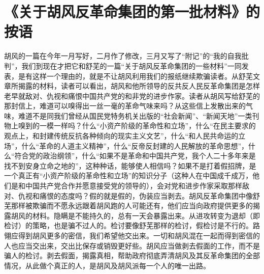 \section[《关于胡风反革命集团的第一批材料》的按语（一九五五年五月十三日）]{《关于胡风反革命集团的第一批材料》的按语}


胡风的一篇在今年一月写好，二月作了修改，三月又写了“附记”的“我的自我批判”，我们到现在才把它和舒芜的一篇“关于胡风反革命集团的一些材料”一同发表，是有这样一个理由的，就是不让胡风利用我们的报纸继续欺骗读者。从舒芜文章所揭露的材料，读者可以看出，胡风和他所领导的反共反人民反革命集团是怎样老早就敌对、仇视和痛恨中国共产党的和非党的进步作家。读者从胡风写给舒芜的那封信上，难道可以嗅得出一丝一毫的革命气味来吗？从这些信上发散出来的气味，难道不是同我们曾经从国民党特务机关出版的“社会新闻”、“新闻天地”一类刊物上嗅到的一模一样吗？什么“小资产阶级的革命性和立场”，什么“在民主要求的观点上，和封建传统反抗各种倾向的现实主义文艺”，什么“和人民共命运的立场”，什么“革命的人道主义精神”，什么“反帝反封建的人民解放的革命思想”，什么“符合党的政治纲领”，什么“如果不是革命和中国共产党，我个人二十多年来是找不到安身立命之地的”，这种种话，能够使人相信吗？如果不是打着假招牌，是一个真正有“小资产阶级的革命性和立场”的知识分子（这种人在中国成千成万，他们是和中国共产党合作并愿意接受党的领导的），会对党和进步作家采取那样敌对、仇视和痛恨的态度吗？假的就是假的，伪装应当剥去。胡风反革命集团中像舒芜那样被欺骗而不愿永远跟着胡风跑的人可能还有，他们应当向政府提供更多的揭露胡风的材料。隐瞒是不能持久的，总有一天会暴露出来。从进攻转变为退却（即检讨）的策略，也是骗不过人的。检讨要像舒芜那样的检讨，假检讨是不行的。路翎应得到胡风更多的密信，我们希望他交出来。一切和胡风混在一起而得到密信的人也应当交出来，交出比保存或销毁更好些。胡风应当做剥去假面的工作，而不是骗人的检讨。剥去假面，揭露真相，帮助政府彻底弄清胡风及其反革命集团的全部情况，从此做个真正的人，是胡风及胡风派每一个人的唯一出路。


